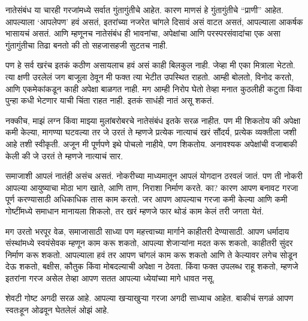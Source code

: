 नातेसंबंध या चारही गरजांमध्ये सर्वात गुंतागुंतीचे आहेत. कारण माणसं हे गुंतागुंतीचे “प्राणी” आहेत. आपल्याला ‘आपलेपण’ हवं असतं, इतरांच्या नजरेत चांगले दिसावं असं वाटत असतं, आपल्याला आकर्षक भासायचं असतं. आणि म्हणूनच नातेसंबंध ही भावनांचा, अपेक्षांचा आणि परस्परसंवादांचा एक असा गुंतागुंतीचा तिढा बनतो की तो सहजासहजी सुटतच नाही.

पण हे सर्व खरंच इतकं कठीण असायलाच हवं असं काही बिलकुल नाही. जेव्हा मी एका मित्राला भेटतो. त्या क्षणी उरलेलं जग बाजूला ठेवून मी फक्त त्या भेटीत उपस्थित राहतो. आम्ही बोलतो, विनोद करतो, आणि एकमेकांकडून काही अपेक्षा बाळगत नाही. मग आम्ही निरोप घेतो तेव्हा मनात कुठलीही कटुता किंवा पुन्हा कधी भेटणार याची चिंता राहत नाही. इतकं साधंही नातं असू शकतं.

नक्कीच, माझं लग्न किंवा माझ्या मुलांबरोबरचे नातेसंबंध इतके सरळ नाहीत. पण मी शिकतोय की अपेक्षा कमी केल्या, मागण्या घटवल्या तर जे उरतं ते म्हणजे प्रत्येक नात्याचं खरं सौंदर्य,  प्रत्येक व्यक्तीला जशी आहे तशी स्वीकृती. अजून मी पूर्णपणे इथे पोचलो नाहीये, पण शिकतोय. अनावश्यक अपेक्षांची वजाबाकी केली की जे उरतं ते म्हणजे नात्याचं सार.

समाजाशी आपलं नातंही असंच असतं. नोकरीच्या माध्यमातून आपलं योगदान ठरवलं जातं. पण ती नोकरी आपल्या आयुष्याचा मोठा भाग खाते, आणि ताण, निराशा निर्माण करते. का? कारण आपण बनावट गरजा पूर्ण करण्यासाठी अधिकाधिक तास काम करतो. जर आपण आपल्याच गरजा कमी केल्या आणि कमी गोष्टींमध्ये समाधान मानायला शिकलो, तर खरं म्हणजे फार थोडं काम केलं तरी जगता येतं.

मग उरतो भरपूर वेळ, समाजासाठी साध्या पण महत्त्वाच्या मार्गाने काहीतरी देण्यासाठी. आपण धर्मादाय संस्थांमध्ये स्वयंसेवक म्हणून काम करू शकतो, आपल्या शेजाऱ्यांना मदत करू शकतो, काहीतरी सुंदर निर्माण करू शकतो. आपल्याला हवं तर आपण चांगलं काम करू शकतो आणि ते केल्यावर लगेच सोडून देऊ शकतो,  बक्षीस, कौतुक किंवा मोबदल्याची अपेक्षा न ठेवता. किंवा फक्त उपलब्ध राहू शकतो, म्हणजे इतरांना गरज असेल तेव्हा आपण सतत आपल्या ध्येयांच्या मागे धावत नसू.

शेवटी गोष्ट अगदी सरळ आहे. आपल्या खऱ्याखुऱ्या गरजा अगदी साध्याच आहेत. बाकीचं सगळं आपण स्वतःहून ओढवून घेतलेलं ओझं आहे.


